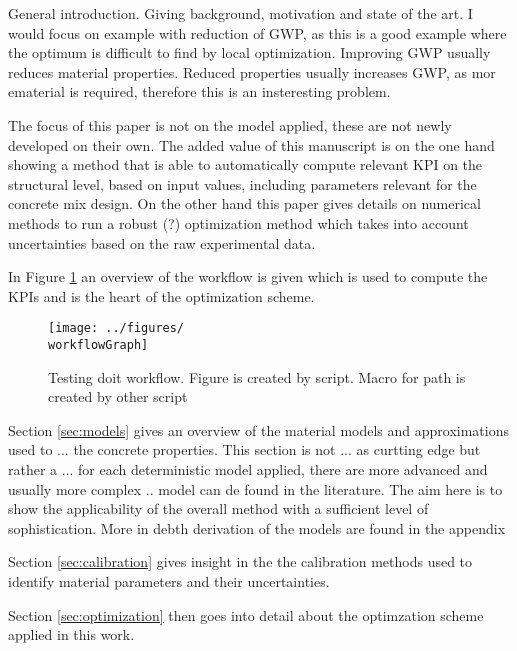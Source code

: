 General introduction.
Giving background, motivation and state of the art.
I would focus on example with reduction of GWP, as this is a good example where the optimum is difficult to find by local optimization.
Improving GWP usually reduces material properties.
Reduced properties usually increases GWP, as mor ematerial is required, therefore this is an insteresting problem.

The focus of this paper is not on the model applied, these are not newly developed on their own.
The added value of this manuscript is on the one hand showing a method that is able to automatically compute relevant KPI on the structural level, based on input values, including parameters relevant for the concrete mix design.
On the other hand this paper gives details on numerical methods to run a robust (?) optimization method which takes into account uncertainties based on the raw experimental data.

In Figure \ref{fig:workflow} an overview of the workflow is given which is used to compute the KPIs and is the heart of the optimization scheme.
\begin{figure}[h]%
	\centering
	\texttt{[image: ../figures/\\workflowGraph]}
	\caption{Testing doit workflow. Figure is created by script. Macro for path is created by other script}\label{fig:workflow}
\end{figure}

Section \ref{sec:models} gives an overview of the material models and approximations used to ... the concrete properties.
This section is not ... as curtting edge but rather a ... 
for each deterministic model applied, there are more advanced and usually more complex .. model can de found in the literature.
The aim here is to show the applicability of the overall method with a sufficient level of sophistication.
More in debth derivation of the models are found in the appendix

Section \ref{sec:calibration} gives insight in the the calibration methods used to identify material parameters and their uncertainties.

Section \ref{sec:optimization} then goes into detail about the optimzation scheme applied in this work.

